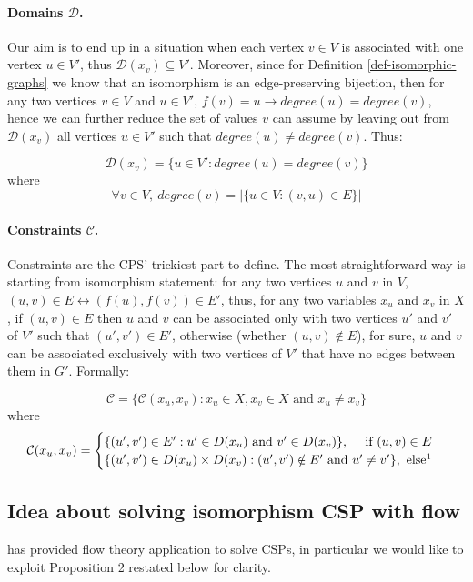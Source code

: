 \documentclass[a4paper,12pt]{article}
\theoremstyle{newplanestyle}
\theoremstyle{newdefinitionstyle}
\theoremstyle{newprovestyle}
\begin{document}
\paragraph{Domains $\mathcal{D}$.}
Our aim is to end up in a situation when each vertex $v \in V$ is associated with one vertex $u \in V'$, thus $\mathcal{D}(x_v) \subseteq V'$. Moreover, since for Definition \ref{def-isomorphic-graphs} we know that an isomorphism is an edge-preserving bijection, then for any two vertices $v \in V$ and $u \in V'$, $f(v)=u \rightarrow degree(u) = degree(v)$, hence we can further reduce the set of values $v$ can assume by leaving out from $\mathcal{D}(x_v)$ all vertices $u \in V'$ such that $degree(u) \neq degree(v)$. Thus:

\[
\mathcal{D}(x_v) = \{u \in V' : degree(u) = degree(v)\}
\]
where
\[
\forall v \in V,\ degree(v) = |\{u \in V : (v,u) \in E \}|
\]

\paragraph{Constraints $\mathcal{C}$.}
Constraints are the CPS' trickiest part to define. The most straightforward way is starting from isomorphism statement: for any two vertices $u$ and $v$ in $V$, $(u,v) \in E \leftrightarrow (f(u),f(v)) \in E'$, thus, for any two variables $x_u$ and $x_v$ in $X$, if $(u,v) \in E$ then $u$ and $v$ can be associated only with two vertices $u'$ and $v'$ of $V'$ such that $(u',v') \in E'$, otherwise (whether $(u,v) \notin E$), for sure, $u$ and $v$ can be associated exclusively with two vertices of $V'$ that have no edges between them in $G'$. Formally:

\[
\mathcal{C} = \{\mathcal{C}(x_u,x_v) : x_u \in X, x_v \in X \text{ and } x_u \neq x_v\}
\]
where
\begin{equation*}
\mathcal{C}(x_u,x_v) = 
	\begin{cases}
\{(u',v') \in E' : u' \in D(x_u) \text{ and } v' \in D(x_v)\}, \hfill \text{if } (u,v) \in E \\
\{(u',v') \in D(x_u) \times D(x_v) : (u',v') \notin E' \text{ and } u' \neq v'\}, \text{ else\footnotemark}
	\end{cases}
\end{equation*}


\subsection{Idea about solving isomorphism CSP with flow}
\cite{Regin:1996:GAC:1892875.1892906} has provided flow theory application to solve CSPs, in particular we would like to exploit Proposition 2 restated below for clarity.
\end{document}
